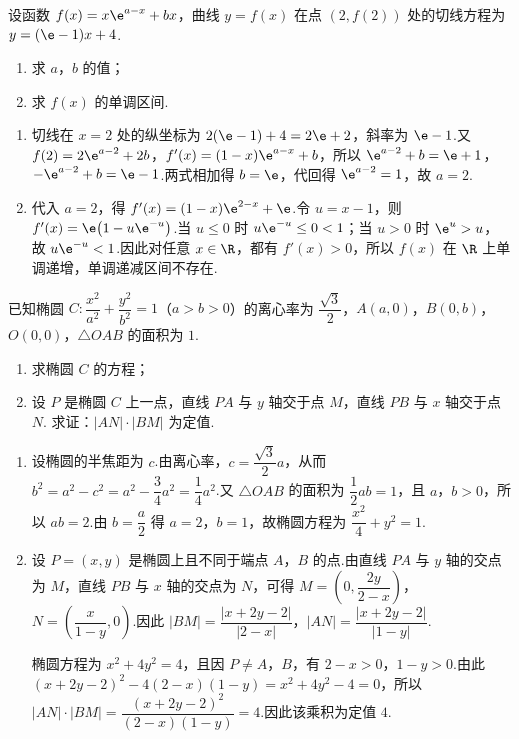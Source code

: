 \begin{problem}
设函数 \(f(x)=x\e^{a-x}+bx\)，曲线 \(y=f(x)\) 在点 \((2,f(2))\) 处的切线方程为 \(y=(\e-1)x+4\).

\begin{enumerate}
\item 求 \(a\)，\(b\) 的值；
\item 求 \(f(x)\) 的单调区间.
\end{enumerate}
\end{problem}

\begin{solution}
\begin{enumerate}
\item 切线在 \(x=2\) 处的纵坐标为 \(2(\e-1)+4=2\e+2\)，斜率为 \(\e-1\).又
\(f(2)=2\e^{a-2}+2b\)，\(f'(x)=(1-x)\e^{a-x}+b\)，所以
\(\e^{a-2}+b=\e+1\)，\(-\e^{a-2}+b=\e-1\).两式相加得 \(b=\e\)，代回得 \(\e^{a-2}=1\)，故 \(a=2\).
\item 代入 \(a=2\)，得 \(f'(x)=(1-x)\e^{2-x}+\e\).令 \(u=x-1\)，则
\(f'(x)=\e\bigl(1-u\e^{-u}\bigr)\).当 \(u\le0\) 时 \(u\e^{-u}\le0<1\)；当 \(u>0\) 时 \(\e^u>u\)，故 \(u\e^{-u}<1\).因此对任意 \(x\in\R\)，都有 \(f'(x)>0\)，所以 \(f(x)\) 在 \(\R\) 上单调递增，单调递减区间不存在.
\end{enumerate}
\end{solution}

\begin{problem}
已知椭圆 \(C:\dfrac{x^2}{a^2}+\dfrac{y^2}{b^2}=1\)（\(a>b>0\)）的离心率为 \(\dfrac{\sqrt3}{2}\)，\(A(a,0)\)，\(B(0,b)\)，\(O(0,0)\)，\(\triangle OAB\) 的面积为 \(1\).

\begin{enumerate}
\item 求椭圆 \(C\) 的方程；
\item 设 \(P\) 是椭圆 \(C\) 上一点，直线 \(PA\) 与 \(y\) 轴交于点 \(M\)，直线 \(PB\) 与 \(x\) 轴交于点 \(N\). 求证：\(|AN|\cdot|BM|\) 为定值.
\end{enumerate}

\end{problem}

\begin{solution}
\begin{enumerate}
\item 设椭圆的半焦距为 \(c\).由离心率，\(c=\dfrac{\sqrt3}{2}a\)，从而
\(b^2=a^2-c^2=a^2-\dfrac34a^2=\dfrac14a^2\).又 \(\triangle OAB\) 的面积为 \(\dfrac12ab=1\)，且 \(a\)，\(b>0\)，所以 \(ab=2\).由 \(b=\dfrac a2\) 得 \(a=2\)，\(b=1\)，故椭圆方程为 \(\dfrac{x^2}{4}+y^2=1\).
\item 设 \(P=(x,y)\) 是椭圆上且不同于端点 \(A\)，\(B\) 的点.由直线 \(PA\) 与 \(y\) 轴的交点为 \(M\)，直线 \(PB\) 与 \(x\) 轴的交点为 \(N\)，可得
\(M=\left(0,\dfrac{2y}{2-x}\right)\)，\(N=\left(\dfrac{x}{1-y},0\right)\).因此
\(|BM|=\dfrac{|x+2y-2|}{|2-x|}\)，\(|AN|=\dfrac{|x+2y-2|}{|1-y|}\).

椭圆方程为 \(x^2+4y^2=4\)，且因 \(P\ne A\)，\(B\)，有 \(2-x>0\)，\(1-y>0\).由此
\((x+2y-2)^2-4(2-x)(1-y)=x^2+4y^2-4=0\)，所以
\(|AN|\cdot|BM|=\dfrac{(x+2y-2)^2}{(2-x)(1-y)}=4\).因此该乘积为定值 \(4\).
\end{enumerate}
\end{solution}

